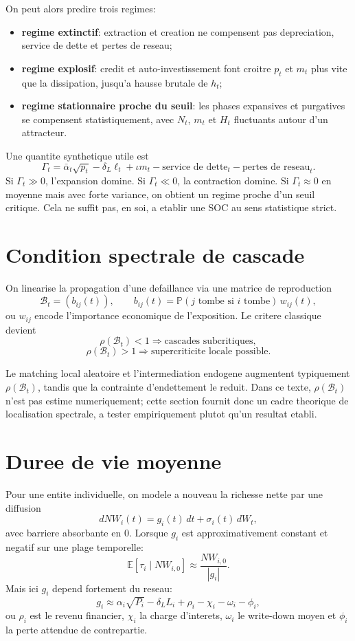 \documentclass[11pt,a4paper]{article}
\begin{document}
On peut alors predire trois regimes:
\begin{itemize}
\item \textbf{regime extinctif}: extraction et creation ne compensent pas depreciation, service de dette et pertes de reseau;
\item \textbf{regime explosif}: credit et auto-investissement font croitre $p_t$ et $m_t$ plus vite que la dissipation, jusqu'a hausse brutale de $h_t$;
\item \textbf{regime stationnaire proche du seuil}: les phases expansives et purgatives se compensent statistiquement, avec $N_t$, $m_t$ et $H_t$ fluctuants autour d'un attracteur.
\end{itemize}

Une quantite synthetique utile est
\[
\Gamma_t =
\bar\alpha_t\sqrt{p_t}
-\delta_L\ell_t
+\iota m_t
-\text{service de dette}_t
-\text{pertes de reseau}_t.
\]
Si $\Gamma_t \gg 0$, l'expansion domine. Si $\Gamma_t \ll 0$, la contraction domine. Si $\Gamma_t \approx 0$ en moyenne mais avec forte variance, on obtient un regime proche d'un seuil critique. Cela ne suffit pas, en soi, a etablir une SOC au sens statistique strict.

\section{Condition spectrale de cascade}
On linearise la propagation d'une defaillance via une matrice de reproduction
\[
\mathcal B_t = (b_{ij}(t)),
\qquad
b_{ij}(t)=
\mathbb P(j \text{ tombe si } i \text{ tombe})\,w_{ij}(t),
\]
ou $w_{ij}$ encode l'importance economique de l'exposition. Le critere classique devient
\[
\rho(\mathcal B_t)<1
\Rightarrow
\text{cascades subcritiques},
\]
\[
\rho(\mathcal B_t)>1
\Rightarrow
\text{supercriticite locale possible}.
\]

Le matching local aleatoire et l'intermediation endogene augmentent typiquement $\rho(\mathcal B_t)$, tandis que la contrainte d'endettement le reduit. Dans ce texte, $\rho(\mathcal B_t)$ n'est pas estime numeriquement; cette section fournit donc un cadre theorique de localisation spectrale, a tester empiriquement plutot qu'un resultat etabli.

\section{Duree de vie moyenne}
Pour une entite individuelle, on modele a nouveau la richesse nette par une diffusion
\[
dNW_i(t)=g_i(t)\,dt+\sigma_i(t)\,dW_t,
\]
avec barriere absorbante en $0$. Lorsque $g_i$ est approximativement constant et negatif sur une plage temporelle:
\[
\mathbb E[\tau_i \mid NW_{i,0}] \approx \frac{NW_{i,0}}{|g_i|}.
\]
Mais ici $g_i$ depend fortement du reseau:
\[
g_i
\approx
\alpha_i\sqrt{P_i}
-\delta_L L_i
+\rho_i-\chi_i-\omega_i-\phi_i,
\]
ou $\rho_i$ est le revenu financier, $\chi_i$ la charge d'interets, $\omega_i$ le write-down moyen et $\phi_i$ la perte attendue de contrepartie.
\end{document}
